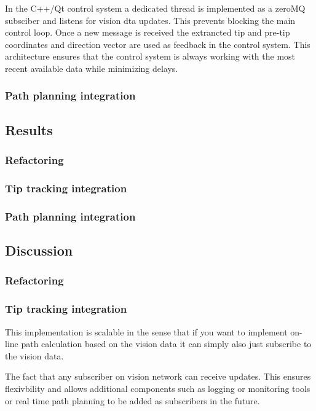 In the C++/Qt control system a dedicated thread is implemented as a zeroMQ subsciber and listens for vision dta updates. This prevents blocking the main control loop. Once a new message is received the extrancted tip and pre-tip coordinates and direction vector are used as feedback in the control system. This architecture ensures that the control system is always working with the most recent available data while minimizing delays.

\subsubsection{Path planning integration}

\subsection{Results}
\subsubsection{Refactoring}
\subsubsection{Tip tracking integration}

\subsubsection{Path planning integration}


\subsection{Discussion}
\subsubsection{Refactoring}

\subsubsection{Tip tracking integration}
This implementation is scalable in the sense that if you want to implement on-line path calculation based on the vision data it can simply also just subscribe to the vision data.

The fact that any subscriber on vision network can receive updates. This ensures flexivbility and allows additional components such as logging or monitoring tools or real time path planning to be added as subscribers in the future.

